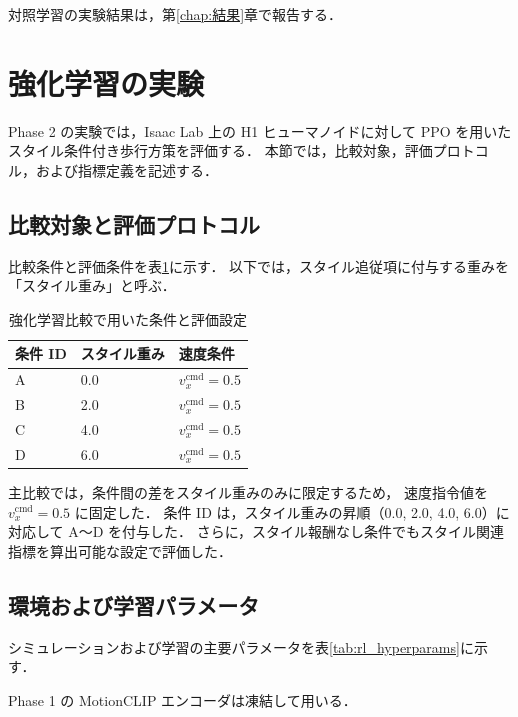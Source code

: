 対照学習の実験結果は，第\ref{chap:結果}章で報告する．

\section{強化学習の実験}
\label{sec:rl_experiment}

Phase 2 の実験では，Isaac Lab 上の H1 ヒューマノイドに対して
PPO を用いたスタイル条件付き歩行方策を評価する．
本節では，比較対象，評価プロトコル，および指標定義を記述する．

\subsection{比較対象と評価プロトコル}
\label{subsec:rl_protocol}

比較条件と評価条件を表\ref{tab:rl_comparison_runs}に示す．
以下では，スタイル追従項に付与する重みを「スタイル重み」と呼ぶ．

\begin{table}[htb]
  \centering
  \caption{強化学習比較で用いた条件と評価設定}
  \label{tab:rl_comparison_runs}
  \small
  \begin{tabular}{lll} \toprule
    \textbf{条件 ID} & \textbf{スタイル重み} & \textbf{速度条件} \\ \midrule
    A & 0.0 & $v_x^{\mathrm{cmd}}=0.5$ \\
    B & 2.0 & $v_x^{\mathrm{cmd}}=0.5$ \\
    C & 4.0 & $v_x^{\mathrm{cmd}}=0.5$ \\
    D & 6.0 & $v_x^{\mathrm{cmd}}=0.5$ \\
    \bottomrule
  \end{tabular}
\end{table}

主比較では，条件間の差をスタイル重みのみに限定するため，
速度指令値を $v_x^{\mathrm{cmd}}=0.5$ に固定した．
条件 ID は，スタイル重みの昇順（0.0, 2.0, 4.0, 6.0）に対応して A～D を付与した．
さらに，スタイル報酬なし条件でもスタイル関連指標を算出可能な設定で評価した．

\subsection{環境および学習パラメータ}
\label{subsec:rl_setup}

シミュレーションおよび学習の主要パラメータを表\ref{tab:rl_hyperparams}に示す．

Phase 1 の MotionCLIP エンコーダは凍結して用いる．

